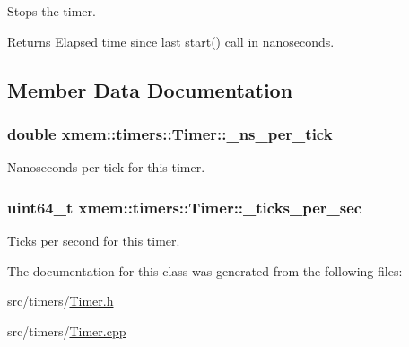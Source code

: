 Stops the timer. 

\begin{DoxyReturn}{Returns}
Elapsed time since last \hyperlink{classxmem_1_1timers_1_1_timer_af94a88fb78dd9edf299d4421e17f5fb3}{start()} call in nanoseconds. 
\end{DoxyReturn}


\subsection{Member Data Documentation}
\hypertarget{classxmem_1_1timers_1_1_timer_a9c737c0df71e4cff93b6fd8dc20595ba}{}
\subsubsection[{\+\_\+ns\+\_\+per\+\_\+tick}]{\setlength{\rightskip}{0pt plus 5cm}double xmem\+::timers\+::\+Timer\+::\+\_\+ns\+\_\+per\+\_\+tick\hspace{0.3cm}{\ttfamily [protected]}}\label{classxmem_1_1timers_1_1_timer_a9c737c0df71e4cff93b6fd8dc20595ba}
Nanoseconds per tick for this timer. \hypertarget{classxmem_1_1timers_1_1_timer_ac038322b59bb4d8df046dedfe6844045}{}
\subsubsection[{\+\_\+ticks\+\_\+per\+\_\+sec}]{\setlength{\rightskip}{0pt plus 5cm}uint64\+\_\+t xmem\+::timers\+::\+Timer\+::\+\_\+ticks\+\_\+per\+\_\+sec\hspace{0.3cm}{\ttfamily [protected]}}\label{classxmem_1_1timers_1_1_timer_ac038322b59bb4d8df046dedfe6844045}
Ticks per second for this timer. 

The documentation for this class was generated from the following files\+:\begin{DoxyCompactItemize}
\item 
src/timers/\hyperlink{_timer_8h}{Timer.\+h}\item 
src/timers/\hyperlink{_timer_8cpp}{Timer.\+cpp}\end{DoxyCompactItemize}
